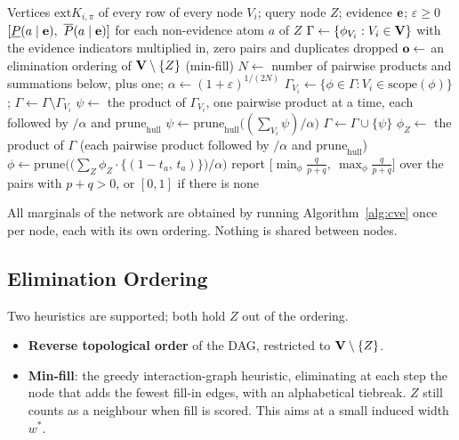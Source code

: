 \documentclass{article} %
\newcommand{\ext}{\mathrm{ext}}
\newcommand{\scope}{\mathrm{scope}}
\newcommand{\prune}{\mathrm{prune}}
\begin{document}
\begin{algorithm}[t!]
\caption{Credal Variable Elimination (CVE) and its FPTAS CVE$_\varepsilon$}
\label{alg:cve}
\begin{algorithmic}[1]
\Require Vertices $\ext K_{i,\pi}$ of every row of every node $V_i$;
         query node $Z$; evidence $\mathbf{e}$; $\varepsilon\ge 0$
\Ensure $[\underline{P}(a\mid\be),\ \overline{P}(a\mid\be)]$ for each non-evidence atom $a$ of $Z$
\Statex
\State $\Gamma \gets \{\phi_{V_i} : V_i\in\mathbf{V}\}$ with the evidence indicators multiplied in,
       zero pairs and duplicates dropped
\State $\mathbf{o} \gets$ an elimination ordering of $\mathbf{V}\setminus\{Z\}$ (min-fill)
\State $N \gets$ number of pairwise products and summations below, plus one;\;
       $\alpha \gets (1+\varepsilon)^{1/(2N)}$
  \State $\Gamma_{V_i} \gets \{\phi \in \Gamma : V_i \in \scope(\phi)\}$;\;
         $\Gamma \gets \Gamma \setminus \Gamma_{V_i}$
  \State $\psi \gets$ the product of $\Gamma_{V_i}$, one pairwise product at a time,
         each followed by $/\alpha$ and $\prune_{\mathrm{hull}}$
  \State $\psi \gets \prune_{\mathrm{hull}}\bigl((\sum_{V_i}\psi)/\alpha\bigr)$
  \State $\Gamma \gets \Gamma \cup \{\psi\}$
\EndFor
\State $\phi_Z \gets$ the product of $\Gamma$ (each pairwise product followed by
       $/\alpha$ and $\prune_{\mathrm{hull}}$)
  \State $\phi \gets \prune\bigl(\bigl(\sum_Z \phi_Z\cdot\{(1-t_a,\,t_a)\}\bigr)/\alpha\bigr)$
  \State report $\bigl[\min_{\phi} \tfrac{q}{p+q},\ \max_{\phi}\tfrac{q}{p+q}\bigr]$ over the
         pairs with $p+q>0$, or $[0,1]$ if there is none
\EndFor
\end{algorithmic}
\end{algorithm}

All marginals of the network are obtained by running Algorithm~\ref{alg:cve} once
per node, each with its own ordering. Nothing is shared between nodes.

\subsection{Elimination Ordering}

Two heuristics are supported; both hold $Z$ out of the ordering.
\begin{itemize}
  \item \textbf{Reverse topological order} of the DAG, restricted to $\mathbf{V}\setminus\{Z\}$.
  \item \textbf{Min-fill}: the greedy interaction-graph heuristic, eliminating at
        each step the node that adds the fewest fill-in edges, with an
        alphabetical tiebreak. $Z$ still counts as a neighbour when fill is
        scored. This aims at a small induced width $w^*$.
\end{itemize}
\end{document}
